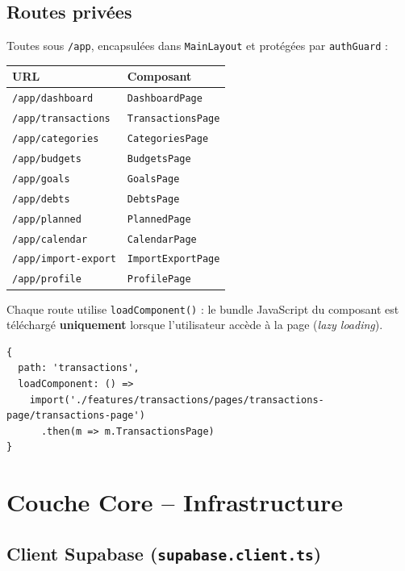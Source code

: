 \documentclass[12pt,a4paper]{article}
\begin{document}
\subsection{Routes privées}

Toutes sous \texttt{/app}, encapsulées dans \texttt{MainLayout} et
protégées par \texttt{authGuard} :

\begin{center}
\begin{tabular}{L{6cm} L{7.5cm}}
\toprule
\textbf{URL} & \textbf{Composant} \\
\midrule
\texttt{/app/dashboard} & \texttt{DashboardPage} \\
\texttt{/app/transactions} & \texttt{TransactionsPage} \\
\texttt{/app/categories} & \texttt{CategoriesPage} \\
\texttt{/app/budgets} & \texttt{BudgetsPage} \\
\texttt{/app/goals} & \texttt{GoalsPage} \\
\texttt{/app/debts} & \texttt{DebtsPage} \\
\texttt{/app/planned} & \texttt{PlannedPage} \\
\texttt{/app/calendar} & \texttt{CalendarPage} \\
\texttt{/app/import-export} & \texttt{ImportExportPage} \\
\texttt{/app/profile} & \texttt{ProfilePage} \\
\bottomrule
\end{tabular}
\end{center}

Chaque route utilise \texttt{loadComponent()} : le bundle JavaScript du composant
est téléchargé \textbf{uniquement} lorsque l'utilisateur accède à la page
(\textit{lazy loading}).

\begin{lstlisting}
{
  path: 'transactions',
  loadComponent: () =>
    import('./features/transactions/pages/transactions-page/transactions-page')
      .then(m => m.TransactionsPage)
}
\end{lstlisting}

\section{Couche Core -- Infrastructure}

\subsection{Client Supabase (\texttt{supabase.client.ts})}
\end{document}
